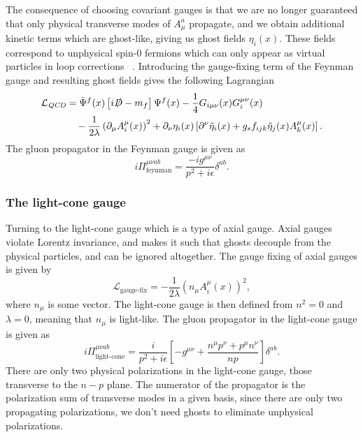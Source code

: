 \documentclass[main.tex]{subfiles}
\begin{document}
The consequence of choosing covariant gauges is that we are no longer guaranteed that only physical transverse modes of \(A_\mu^a\) propagate, and we obtain additional kinetic terms which are ghost-like, giving us ghost fields \(\eta_i(x)\). These fields correspond to unphysical spin-0 fermions which can only appear as virtual particles in loop corrections ~\cite{schwartz2014quantum, mandl2010quantum}. Introducing the gauge-fixing term of the Feynman gauge and resulting ghost fields gives the following Lagrangian
\begin{align}\label{eqn: QCD_Lagrangian_feynman_gaugefixghost}
    \begin{split}
    \mathcal{L}_{\textit{QCD}} &= \bar \Psi^f(x) \left[ i \slashed D -m_f\right] \Psi^f(x) - \frac{1}{4} G_{i\mu\nu}(x)G_{i}^{\mu\nu}(x) \\
    &\quad - \frac{1}{2\lambda} \left( \partial_\mu A_i^\mu(x)\right)^2 + \partial_\nu \eta_i(x) \left[\partial^\nu \tilde \eta_i(x)+g_s f_{ijk} \tilde\eta_j(x) A_k^\mu(x)\right].
    \end{split}
\end{align}
The gluon propagator in the Feynman gauge is given as
\begin{equation}\label{eqn: gluon_propagator_feynman}
    i \Pi_{\text{feynman}}^{\mu\nu ab} = \frac{-i g^{\mu\nu}}{p^2+i\epsilon} \delta^{ab}.
\end{equation}

\subsubsection*{The light-cone gauge}
Turning to the light-cone gauge which is a type of axial gauge. Axial gauges violate Lorentz invariance, and makes it such that ghosts decouple from the physical particles, and can be ignored altogether. The gauge fixing of axial gauges is given by
\begin{equation}\label{eqn: gauge_fixing_axial}
    \mathcal{L}_{\text{gauge-fix}} = -\frac{1}{2\lambda} \left(n_\mu A_i^\mu(x)\right)^2,
\end{equation}
where \(n_\mu\) is some vector. The light-cone gauge is then defined from \(n^2 = 0\) and \(\lambda = 0\), meaning that \(n_\mu\) is light-like. The gluon propagator in the light-cone gauge is given as
\begin{equation}\label{eqn: gluon_propagator_lightcone}
    i \Pi_{\text{light-cone}}^{\mu\nu ab} = \frac{i}{p^2+i\epsilon} \left[-g^{\mu\nu}+ \frac{n^\mu p^\nu+p^\mu n^\nu}{np} \right]\delta^{ab}.
\end{equation}
There are only two physical polarizations in the light-cone gauge, those transverse to the \(n-p\) plane. The numerator of the propagator is the polarization sum of transverse modes in a given basis, since there are only two propagating polarizations, we don't need ghosts to eliminate unphysical polarizations.  
\end{document}
